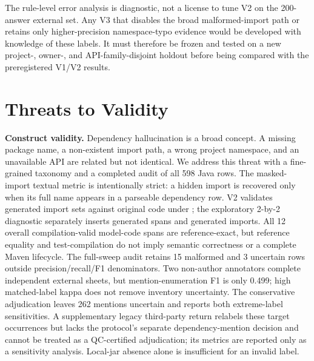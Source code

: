 \documentclass[pdflatex,sn-basic]{sn-jnl}
\newcommand{\codeid}[1]{\texttt{\detokenize{#1}}}
\begin{document}
The rule-level error analysis is diagnostic, not a license to tune V2 on the 200-answer external set. Any V3 that disables the broad malformed-import path or retains only higher-precision namespace-typo evidence would be developed with knowledge of these labels. It must therefore be frozen and tested on a new project-, owner-, and API-family-disjoint holdout before being compared with the preregistered V1/V2 results.

\section{Threats to Validity}

\textbf{Construct validity.} Dependency hallucination is a broad concept. A missing package name, a non-existent import path, a wrong project namespace, and an unavailable API are related but not identical. We address this threat with a fine-grained taxonomy and a completed audit of all 598 Java rows. The masked-import textual metric is intentionally strict: a hidden import is recovered only when its full name appears in a parseable dependency row. V2 validates generated import sets against original code under \codeid{test-compile}; the exploratory 2-by-2 diagnostic separately inserts generated spans and generated imports. All 12 overall compilation-valid model-code spans are reference-exact, but reference equality and test-compilation do not imply semantic correctness or a complete Maven lifecycle. The full-sweep audit retains 15 malformed and 3 uncertain rows outside precision/recall/F1 denominators. Two non-author annotators complete independent external sheets, but mention-enumeration F1 is only 0.499; high matched-label kappa does not remove inventory uncertainty. The conservative adjudication leaves 262 mentions uncertain and reports both extreme-label sensitivities. A supplementary legacy third-party return relabels these target occurrences but lacks the protocol's separate dependency-mention decision and cannot be treated as a QC-certified adjudication; its metrics are reported only as a sensitivity analysis. Local-jar absence alone is insufficient for an invalid label.
\end{document}
